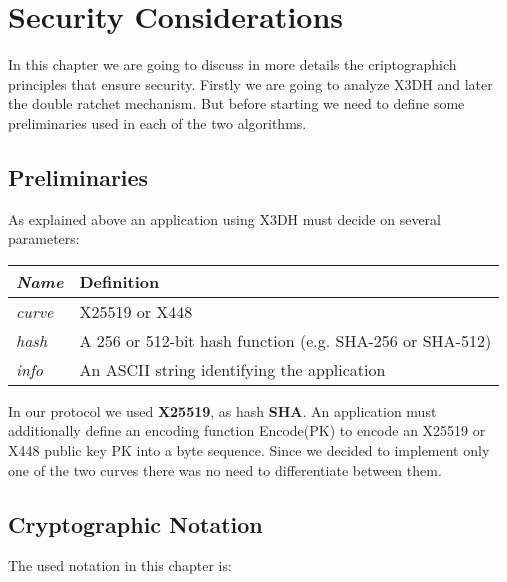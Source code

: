 \chapter{Security Considerations}
\label{cha:Security}

In this chapter we are going to discuss in more details the criptographich principles that ensure security. Firstly we are going to analyze X3DH and later the double ratchet mechanism. But before starting we need to define some preliminaries used in each of the two algorithms.

\section{Preliminaries}
\label{sec:Preliminaries}

As explained above an application using X3DH must decide on several parameters:

\vspace{0.5cm}
\begin{center}
\begin{tabular}{>{\itshape}l p{10cm}}
\toprule
Name & Definition \\
\midrule
curve & X25519 or X448 \\
hash & A 256 or 512-bit hash function (e.g. SHA-256 or SHA-512) \\
info & An ASCII string identifying the application \\
\bottomrule
\end{tabular}
\end{center}

\vspace{0.5cm}

In our protocol we used \textbf{X25519}, as hash \textbf{SHA}. An application must additionally define an encoding function Encode(PK) to encode an X25519 or X448 public key PK into a byte sequence. Since we decided to implement only one of the two curves there was no need to differentiate between them.

\section{Cryptographic Notation}
\label{sec:Crytpographic Notation}

The used notation in this chapter is:

